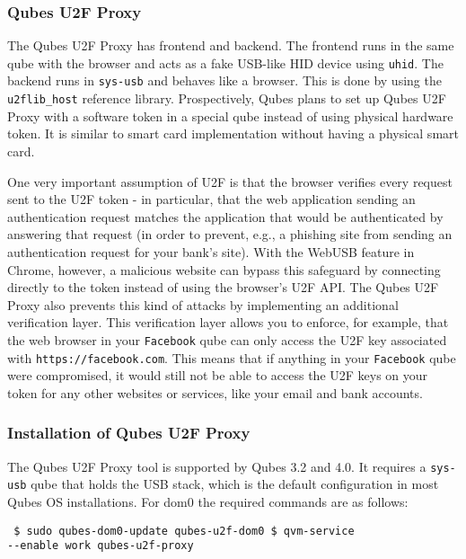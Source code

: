 \documentclass[runningheads,a4paper]{article}
\begin{document}
\subsubsection{Qubes U2F Proxy} 

The Qubes U2F Proxy has frontend and
backend. The frontend runs in the same qube with the browser and acts
as a fake USB-like HID device using \texttt{uhid}. The backend runs in
\texttt{sys-usb} and behaves like a browser. This is done by using the
\texttt{u2flib\_host} reference library. Prospectively, Qubes plans to
set up Qubes U2F Proxy with a software token in a special qube instead
of using physical hardware token. It is similar to smart card
implementation without having a physical smart card.

One very important assumption of U2F is that the browser verifies
every request sent to the U2F token - in particular, that the web
application sending an authentication request matches the application
that would be authenticated by answering that request (in order to
prevent, e.g., a phishing site from sending an authentication request
for your bank's site). With the WebUSB feature in Chrome, however, a
malicious website can bypass this safeguard by connecting directly to
the token instead of using the browser's U2F API.  The Qubes U2F
Proxy also prevents this kind of attacks by implementing an additional
verification layer. This verification layer allows you to enforce, for
example, that the web browser in your \texttt{Facebook} qube can only
access the U2F key associated with \texttt{https://facebook.com}. This
means that if anything in your \texttt{Facebook} qube were
compromised, it would still not be able to access the U2F keys on your
token for any other websites or services, like your email and bank
accounts.

\subsubsection{Installation of Qubes U2F Proxy} 

The Qubes U2F Proxy
tool is supported by Qubes 3.2 and 4.0. It requires a \texttt{sys-usb}
qube that holds the USB stack, which is the default configuration in
most Qubes OS installations. For dom0 the required commands are as
follows:
\begin{verbatim} $ sudo qubes-dom0-update qubes-u2f-dom0 $ qvm-service
--enable work qubes-u2f-proxy
\end{verbatim}
\end{document}
